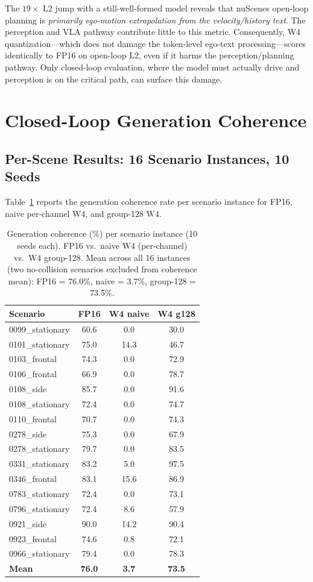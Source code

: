 \documentclass[conference]{IEEEtran}
\begin{document}
The $19\times$ L2 jump with a still-well-formed model reveals that nuScenes open-loop planning
is \emph{primarily ego-motion extrapolation from the velocity/history text}. The perception and
VLA pathway contribute little to this metric. Consequently, W4 quantization---which does not
damage the token-level ego-text processing---scores identically to FP16 on open-loop L2, even
if it harms the perception/planning pathway. Only closed-loop evaluation, where the model must
actually drive and perception is on the critical path, can surface this damage.

\section{Closed-Loop Generation Coherence}
\label{sec:closedloop}

\subsection{Per-Scene Results: 16 Scenario Instances, 10 Seeds}

Table~\ref{tab:perscene} reports the generation coherence rate per scenario instance for FP16,
naive per-channel W4, and group-128 W4.

\begin{table}[t]\centering\small
\caption{Generation coherence (\%) per scenario instance (10 seeds each). FP16 vs.\ naive W4
(per-channel) vs.\ W4 group-128. Mean across all 16 instances (two no-collision scenarios
excluded from coherence mean): FP16 = 76.0\%, naive = 3.7\%, group-128 = 73.5\%.}
\label{tab:perscene}
\begin{tabular}{lccc}
\toprule
Scenario & FP16 & W4 naive & W4 g128 \\
\midrule
0099\_stationary & 60.6 & 0.0 & 30.0 \\
0101\_stationary & 75.0 & 14.3 & 46.7 \\
0103\_frontal & 74.3 & 0.0 & 72.9 \\
0106\_frontal & 66.9 & 0.0 & 78.7 \\
0108\_side & 85.7 & 0.0 & 91.6 \\
0108\_stationary & 72.4 & 0.0 & 74.7 \\
0110\_frontal & 70.7 & 0.0 & 74.3 \\
0278\_side & 75.3 & 0.0 & 67.9 \\
0278\_stationary & 79.7 & 0.0 & 83.5 \\
0331\_stationary & 83.2 & 5.0 & 97.5 \\
0346\_frontal & 83.1 & 15.6 & 86.9 \\
0783\_stationary & 72.4 & 0.0 & 73.1 \\
0796\_stationary & 72.4 & 8.6 & 57.9 \\
0921\_side & 90.0 & 14.2 & 90.4 \\
0923\_frontal & 74.6 & 0.8 & 72.1 \\
0966\_stationary & 79.4 & 0.0 & 78.3 \\
\midrule
\textbf{Mean} & \textbf{76.0} & \textbf{3.7} & \textbf{73.5} \\
\bottomrule
\end{tabular}
\end{table}
\end{document}
